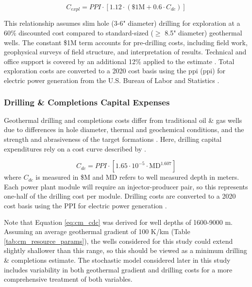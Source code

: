 \begin{equation}
\label{eq:cm_capex_expl}
    C_{expl} = PPI \cdot \left[ 1.12 \cdot (\$1\text{M} + 0.6\cdot C_{dc}) \right]
\end{equation}

This relationship assumes slim hole (3-6" diameter) drilling for exploration at a 60\% discounted cost compared to standard-sized ($\geq$ 8.5" diameter) geothermal wells. The constant \$1M term accounts for pre-drilling costs, including field work, geophysical surveys of field structure, and interpretation of results. Technical and office support is covered by an additional 12\% applied to the estimate \citep{eere_getem_2012}. Total exploration costs are converted to a 2020 cost basis using the \acrlong{ppi} (\acrshort{ppi}) for electric power generation from the U.S. Bureau of Labor and Statistics \citep{us_bls_ppi_2021}.

\subsubsection{Drilling \& Completions Capital Expenses} \label{ch4:cm_capex_dc}
Geothermal drilling and completions costs differ from traditional oil \& gas wells due to differences in hole diameter, thermal and geochemical conditions, and the strength and abrasiveness of the target formations \citep{lowry_geovision_2017}. Here, drilling capital expenditures rely on a cost curve described by \citet[Eq. 4,\ ][]{beckers_introducing_2013}.

\begin{equation}
\label{eq:cm_cdc}
    C_{dc} = PPI \cdot \left[ 1.65 \cdot 10^{-5} \cdot \text{MD}^{1.607} \right]
\end{equation}
where $C_{dc}$ is measured in \$M and MD refers to well measured depth in meters. Each power plant module will require an injector-producer pair, so this represents one-half of the drilling cost per module. Drilling costs are converted to a 2020 cost basis using the PPI for electric power generation \citep{us_bls_ppi_2021}. 

Note that Equation \ref{eq:cm_cdc} was derived for well depths of 1600-9000 m. Assuming an average geothermal gradient of 100 K/km (Table \ref{tab:cm_resource_params}), the wells considered for this study could extend slightly shallower than this range, so this should be viewed as a minimum drilling \& completions estimate. The stochastic model considered later in this study includes variability in both geothermal gradient and drilling costs for a more comprehensive treatment of both variables.

